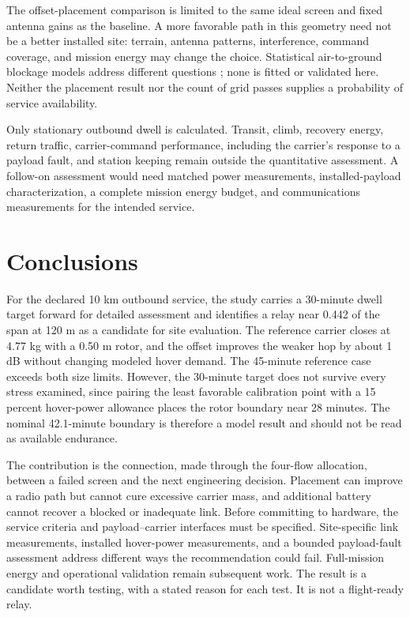 \documentclass[twocolumn,letterpaper]{IEEEAerospaceCLS}
\begin{document}
The offset-placement comparison is limited to the same ideal screen and fixed antenna gains as the baseline. A more favorable path in this geometry need not be a better installed site: terrain, antenna patterns, interference, command coverage, and mission energy may change the choice. Statistical air-to-ground blockage models address different questions \cite{alhourani}; none is fitted or validated here. Neither the placement result nor the count of grid passes supplies a probability of service availability.

Only stationary outbound dwell is calculated. Transit, climb, recovery energy, return traffic, carrier-command performance, including the carrier's response to a payload fault, and station keeping remain outside the quantitative assessment. A follow-on assessment would need matched power measurements, installed-payload characterization, a complete mission energy budget, and communications measurements for the intended service.

\section{Conclusions}\label{sec:conclusions}

For the declared 10 km outbound service, the study carries a 30-minute dwell target forward for detailed assessment and identifies a relay near 0.442 of the span at 120 m as a candidate for site evaluation. The reference carrier closes at 4.77 kg with a 0.50 m rotor, and the offset improves the weaker hop by about 1 dB without changing modeled hover demand. The 45-minute reference case exceeds both size limits. However, the 30-minute target does not survive every stress examined, since pairing the least favorable calibration point with a 15 percent hover-power allowance places the rotor boundary near 28 minutes. The nominal 42.1-minute boundary is therefore a model result and should not be read as available endurance.

The contribution is the connection, made through the four-flow allocation, between a failed screen and the next engineering decision. Placement can improve a radio path but cannot cure excessive carrier mass, and additional battery cannot recover a blocked or inadequate link. Before committing to hardware, the service criteria and payload--carrier interfaces must be specified. Site-specific link measurements, installed hover-power measurements, and a bounded payload-fault assessment address different ways the recommendation could fail. Full-mission energy and operational validation remain subsequent work. The result is a candidate worth testing, with a stated reason for each test. It is not a flight-ready relay.
\end{document}
